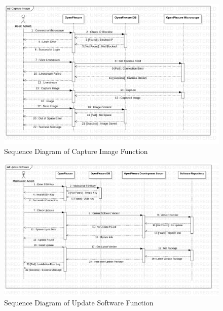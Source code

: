 



\begin{figure}[H]
	\centering
	\includegraphics[scale=0.4]{Uml_Images/capture_image_sequence_diagram}
	\caption{Sequence Diagram of Capture Image Function}
	\label{fig:capture_image_sequence_diagram}
\end{figure}













\begin{figure}[H]
	\centering
	\includegraphics[scale=0.4]{Uml_Images/update_software_sequence_diagram}
	\caption{Sequence Diagram of Update Software Function}
	\label{fig:update_software_sequence_diagram}
\end{figure}
